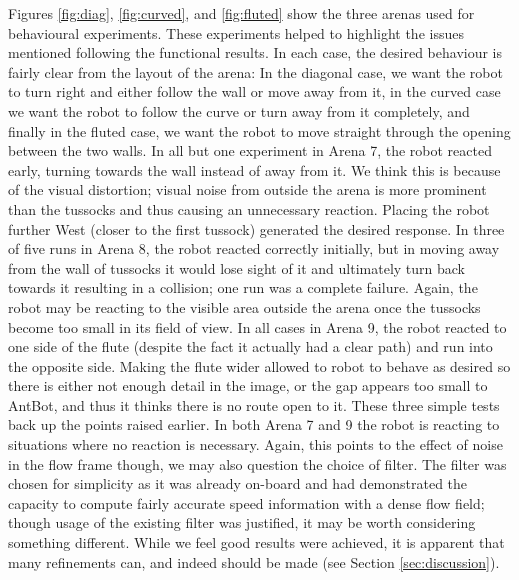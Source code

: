 \documentclass[a4paper,11pt,twoside,openright]{article}
\begin{document}
Figures \ref{fig:diag}, \ref{fig:curved}, and \ref{fig:fluted} show the three arenas used for behavioural experiments. These experiments
helped to highlight the issues mentioned following the functional results. In each case, the desired behaviour is fairly clear from the layout of
the arena: In the diagonal case, we want the robot to turn right and either follow the wall or move away from it, in the curved case we want the
robot to follow the curve or turn away from it completely, and finally in the fluted case, we want the robot to move straight through the
opening between the two walls. In all but one experiment in Arena 7, the robot reacted early, turning towards the wall instead of away from it. We
think this is because of the visual distortion; visual noise from outside the arena is more prominent than the tussocks and thus causing an unnecessary
reaction. Placing the robot further West (closer to the first tussock) generated the desired response. 
In three of five runs in Arena 8, the robot reacted correctly initially, but in moving away from the wall of tussocks it would lose sight of it and ultimately
turn back towards it resulting in a collision; one run was a complete failure. Again, the robot may be reacting to the visible area outside the arena once
the tussocks become too small in its field of view. In all cases in Arena 9, the robot reacted to one side of the
flute (despite the fact it actually
had a clear path) and run into the opposite side. Making the flute wider allowed to robot to behave as desired so there is either not enough detail in
the image, or the gap appears too small to AntBot, and thus it thinks there is no route open to it. These three simple tests back up the points raised earlier.
In both Arena 7 and 9 the robot
is reacting to situations where no reaction is necessary. Again, this points to the effect of noise in the flow frame though, we may also
question the choice of filter. The filter was chosen for simplicity as it was already on-board and had demonstrated the capacity to compute
fairly accurate speed information \cite{Scimeca2017} with a dense flow field; though usage of the existing filter was justified,
it may be worth considering something different. While we feel good results were achieved, it is apparent that many refinements can, and indeed should
be made (see Section \ref{sec:discussion}).
\end{document}
